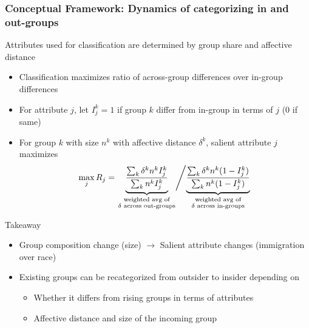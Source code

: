 \documentclass[aspectratio=169]{beamer}
\begin{document}
\begin{frame}
\frametitle{Conceptual Framework: Dynamics of categorizing  in and out-groups}

Attributes used for classification are determined by group share and affective distance
\begin{itemize}\setlength\itemsep{3pt}
\item Classification maximizes ratio of across-group differences over in-group differences
\item For attribute $j$, let $I_j^k=1$ if group $k$ differ from in-group in terms of $j$ (0 if same)
\item For group $k$ with size $n^k$ with affective distance $\delta^k$, salient attribute $j$ maximizes
\[
\max_j R_j =\left. \underbrace{\frac{\sum_k \delta^k n^k I_j^k}{\sum_k n^k I_j^k}}_{\substack{\text{weighted avg of} \\ \delta\text{ across out-groups}
}}\middle/ \underbrace{\frac{\sum_k \delta^k n^k (1-I_j^k)}{\sum_k n^k (1-I_j^k)}}_{\substack{\text{weighted avg of} \\ \delta\text{ across in-groups}
}}\right.
\]
\end{itemize}\medskip \vspace{-10pt}
Takeaway %
\begin{itemize}\setlength\itemsep{3pt}
\item Group composition change (size) $\to$ Salient attribute changes (immigration over race)
\item Existing groups can be recategorized from outsider to insider depending on
\begin{itemize}\setlength\itemsep{3pt}
\item Whether it differs from rising groups in terms of attributes
\item Affective distance and size of the incoming group
\end{itemize}
\end{itemize}
\end{frame}
\end{document}
